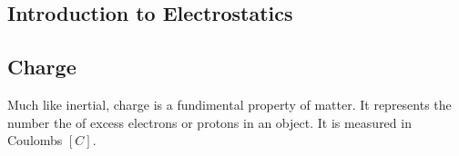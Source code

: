 \begin{center}
    \section{Introduction to Electrostatics}
\end{center}

\hrulefill

\subsection*{Charge}

\hspace{.5cm}
Much like inertial, charge is a fundimental property of matter. It represents the number the of excess electrons or protons in an object. 
It is measured in Coulombs $[C]$.\\